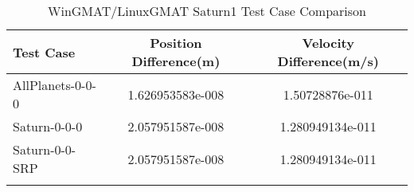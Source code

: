 \begin{table}[htbp!]
\centering
\caption{ WinGMAT/LinuxGMAT Saturn1 Test Case Comparison}
      \begin{tabular}{lcc}
      \hline\hline
          Test Case & Position Difference(m) & Velocity Difference(m/s) \\
         \hline
         AllPlanets-0-0-0 & 1.626953583e-008 & 1.50728876e-011 \\
         Saturn-0-0-0 & 2.057951587e-008 & 1.280949134e-011 \\
         Saturn-0-0-SRP & 2.057951587e-008 & 1.280949134e-011 \\
      \hline\hline
      \label{Table: Saturn1 WinGMAT-LinuxGMAT Table} 
\end{tabular}
\end{table}
